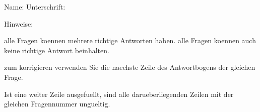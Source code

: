 \documentclass{article}
\begin{document}
Name:
Unterschrift:

Hinweise:

alle Fragen koennen mehrere richtige Antworten haben.
alle Fragen koennen auch keine richtige Antwort beinhalten.

zum korrigieren verwenden Sie die naechste Zeile des Antwortbogens der gleichen Frage.

Ist eine weiter Zeile ausgefuellt, sind alle darueberliegenden Zeilen mit der gleichen Fragennummer ungueltig.

\end{document}
